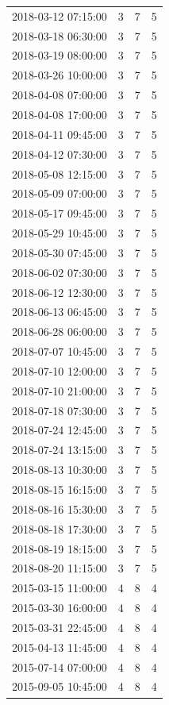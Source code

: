 \begin{tabular}{lrrr}
2018-03-12 07:15:00 & 3 & 7 & 5 \\
2018-03-18 06:30:00 & 3 & 7 & 5 \\
2018-03-19 08:00:00 & 3 & 7 & 5 \\
2018-03-26 10:00:00 & 3 & 7 & 5 \\
2018-04-08 07:00:00 & 3 & 7 & 5 \\
2018-04-08 17:00:00 & 3 & 7 & 5 \\
2018-04-11 09:45:00 & 3 & 7 & 5 \\
2018-04-12 07:30:00 & 3 & 7 & 5 \\
2018-05-08 12:15:00 & 3 & 7 & 5 \\
2018-05-09 07:00:00 & 3 & 7 & 5 \\
2018-05-17 09:45:00 & 3 & 7 & 5 \\
2018-05-29 10:45:00 & 3 & 7 & 5 \\
2018-05-30 07:45:00 & 3 & 7 & 5 \\
2018-06-02 07:30:00 & 3 & 7 & 5 \\
2018-06-12 12:30:00 & 3 & 7 & 5 \\
2018-06-13 06:45:00 & 3 & 7 & 5 \\
2018-06-28 06:00:00 & 3 & 7 & 5 \\
2018-07-07 10:45:00 & 3 & 7 & 5 \\
2018-07-10 12:00:00 & 3 & 7 & 5 \\
2018-07-10 21:00:00 & 3 & 7 & 5 \\
2018-07-18 07:30:00 & 3 & 7 & 5 \\
2018-07-24 12:45:00 & 3 & 7 & 5 \\
2018-07-24 13:15:00 & 3 & 7 & 5 \\
2018-08-13 10:30:00 & 3 & 7 & 5 \\
2018-08-15 16:15:00 & 3 & 7 & 5 \\
2018-08-16 15:30:00 & 3 & 7 & 5 \\
2018-08-18 17:30:00 & 3 & 7 & 5 \\
2018-08-19 18:15:00 & 3 & 7 & 5 \\
2018-08-20 11:15:00 & 3 & 7 & 5 \\
2015-03-15 11:00:00 & 4 & 8 & 4 \\
2015-03-30 16:00:00 & 4 & 8 & 4 \\
2015-03-31 22:45:00 & 4 & 8 & 4 \\
2015-04-13 11:45:00 & 4 & 8 & 4 \\
2015-07-14 07:00:00 & 4 & 8 & 4 \\
2015-09-05 10:45:00 & 4 & 8 & 4 \\

\end{tabular}
